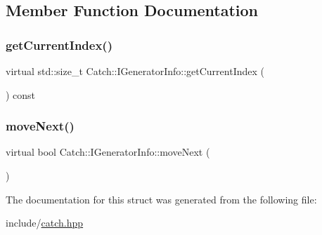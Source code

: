\subsection{Member Function Documentation}
\mbox{\label{struct_catch_1_1_i_generator_info_a6a0dca712d31f6849fd9447b1344673a}} 
\subsubsection{\texorpdfstring{get\+Current\+Index()}{getCurrentIndex()}}
{\footnotesize\ttfamily virtual std\+::size\+\_\+t Catch\+::\+I\+Generator\+Info\+::get\+Current\+Index (\begin{DoxyParamCaption}{ }\end{DoxyParamCaption}) const\hspace{0.3cm}{\ttfamily [pure virtual]}}

\mbox{\label{struct_catch_1_1_i_generator_info_a2b86711ca7009903edfe27ed62b515ef}} 
\subsubsection{\texorpdfstring{move\+Next()}{moveNext()}}
{\footnotesize\ttfamily virtual bool Catch\+::\+I\+Generator\+Info\+::move\+Next (\begin{DoxyParamCaption}{ }\end{DoxyParamCaption})\hspace{0.3cm}{\ttfamily [pure virtual]}}



The documentation for this struct was generated from the following file\+:\begin{DoxyCompactItemize}
\item 
include/\mbox{\hyperlink{catch_8hpp}{catch.\+hpp}}\end{DoxyCompactItemize}
